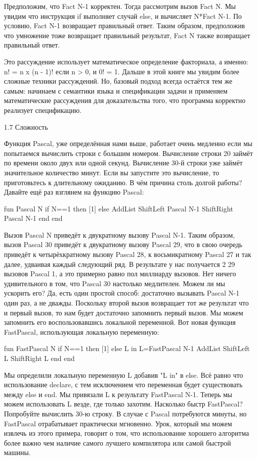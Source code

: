 Предположим, что {Fact N-1} корректен. Тогда рассмотрим вызов {Fact N}. Мы увидим что инструкция if выполняет случай else, и вычисляет N*{Fact N-1}. По условию, {Fact N-1} возвращает правильный ответ. Таким образом, предположив что умножение тоже возвращает правильный результат, {Fact N} также возвращает правильный ответ.

Это рассуждение использует математическое определение факториала, а именно: n! = n x (n - 1)! если n > 0, и 0! = 1. Дальше в этой книге мы увидим более сложные техники рассуждений. Но, базовый подход всегда остаётся тем же самым: начинаем с семантики языка и спецификации задачи и применяем математические рассуждения для доказательства того, что программа корректно реализует спецификацию.

1.7 Сложность

Функция Pascal, уже определённая нами выше, работает очень медленно если мы попытаемся вычислить строки с большим номером. Вычисление строки 20 займёт по времени около двух или одной секунд. Вычисление 30-й строки уже займёт значительное количество минут. Если вы запустите это вычисление, то приготовьтесь к длительному ожиданию. В чём причина столь долгой работы? Давайте ещё раз взглянем на функцию Pascal:

fun {Pascal N}
if N==1 then [1]
else
{AddList {ShiftLeft {Pascal N-1}}
{ShiftRight {Pascal N-1}}}
end
end

Вызов {Pascal N} приведёт к двукратному вызову {Pascal N-1}. Таким образом, вызов {Pascal 30} приведёт к двукратному вызову {Pascal 29}, что в свою очередь приведёт к четырёхкратному вызову {Pascal 28}, к восьмикратному {Pascal 27} и так далее, удваивая каждый следующий ряд. В результате у нас получается 2 29 вызовов {Pascal 1}, а это примерно равно пол миллиарду вызовов. Нет ничего удивительного в том, что {Pascal 30} настолько медлителен. Можем ли мы ускорить его? Да, есть один простой способ: достаточно вызывать {Pascal N-1} один раз, а не дважды. Поскольку второй вызов возвращает тот же результат что и первый вызов, то нам будет достаточно запомнить первый вызов. Мы можем запомнить его воспользовавшись локальной переменной. Вот новая функция FastPascal, использующая локальную переменную:

fun {FastPascal N}
if N==1 then [1]
else L in
L={FastPascal N-1}
{AddList {ShiftLeft L} {ShiftRight L}}
end
end

Мы определили локальную переменную L добавив "L in" в else. Всё равно что использование declare, с тем исключением что переменная будет существовать между else и end. Мы привязали L к результату {FastPascal N-1}. Теперь мы можем использовать L везде, где только захотим. Насколько быстр FastPascal? Попробуйте вычислить 30-ю строку. В случае с Pascal потребуются минуты, но FastPascal отрабатывает практически мгновенно. Урок, который мы можем извлечь из этого примера, говорит о том, что использование хорошего алгоритма более важно чем наличие самого лучшего компилятора или самой быстрой машины.


